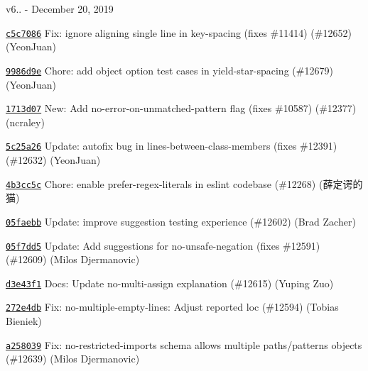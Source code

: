 v6.. -\/ December 20, 2019


\begin{DoxyItemize}
\item \href{https://github.com/eslint/eslint/commit/c5c708666b450fb69522a55aa375626f9297dc6f}{\texttt{ {\ttfamily c5c7086}}} Fix\+: ignore aligning single line in key-\/spacing (fixes \#11414) (\#12652) (Yeon\+Juan)
\item \href{https://github.com/eslint/eslint/commit/9986d9e0baed0d3586bbee472fe2fae2ed625f5d}{\texttt{ {\ttfamily 9986d9e}}} Chore\+: add object option test cases in yield-\/star-\/spacing (\#12679) (Yeon\+Juan)
\item \href{https://github.com/eslint/eslint/commit/1713d0758b083f3840d724505f997a7cb20ff384}{\texttt{ {\ttfamily 1713d07}}} New\+: Add no-\/error-\/on-\/unmatched-\/pattern flag (fixes \#10587) (\#12377) (ncraley)
\item \href{https://github.com/eslint/eslint/commit/5c25a26608fbd9a1d0127c9a3653609aa4b63e86}{\texttt{ {\ttfamily 5c25a26}}} Update\+: autofix bug in lines-\/between-\/class-\/members (fixes \#12391) (\#12632) (Yeon\+Juan)
\item \href{https://github.com/eslint/eslint/commit/4b3cc5cd2459f04eae149faea0651785d7f9db0b}{\texttt{ {\ttfamily 4b3cc5c}}} Chore\+: enable prefer-\/regex-\/literals in eslint codebase (\#12268) (薛定谔的猫)
\item \href{https://github.com/eslint/eslint/commit/05faebb943456ad2b20117f3c8b3eccbe2e2fb03}{\texttt{ {\ttfamily 05faebb}}} Update\+: improve suggestion testing experience (\#12602) (Brad Zacher)
\item \href{https://github.com/eslint/eslint/commit/05f7dd53ed91a6e3be9eb40825fb6d2207f82209}{\texttt{ {\ttfamily 05f7dd5}}} Update\+: Add suggestions for no-\/unsafe-\/negation (fixes \#12591) (\#12609) (Milos Djermanovic)
\item \href{https://github.com/eslint/eslint/commit/d3e43f1c10c5e19f40e7b3d3944b87f1b0c9c075}{\texttt{ {\ttfamily d3e43f1}}} Docs\+: Update no-\/multi-\/assign explanation (\#12615) (Yuping Zuo)
\item \href{https://github.com/eslint/eslint/commit/272e4db6074283bc01cc6ec72c9e396bb3c110e6}{\texttt{ {\ttfamily 272e4db}}} Fix\+: no-\/multiple-\/empty-\/lines\+: Adjust reported {\ttfamily loc} (\#12594) (Tobias Bieniek)
\item \href{https://github.com/eslint/eslint/commit/a258039e556075d7d1f955a79d094ea103ec165a}{\texttt{ {\ttfamily a258039}}} Fix\+: no-\/restricted-\/imports schema allows multiple paths/patterns objects (\#12639) (Milos Djermanovic)

\end{DoxyItemize}
